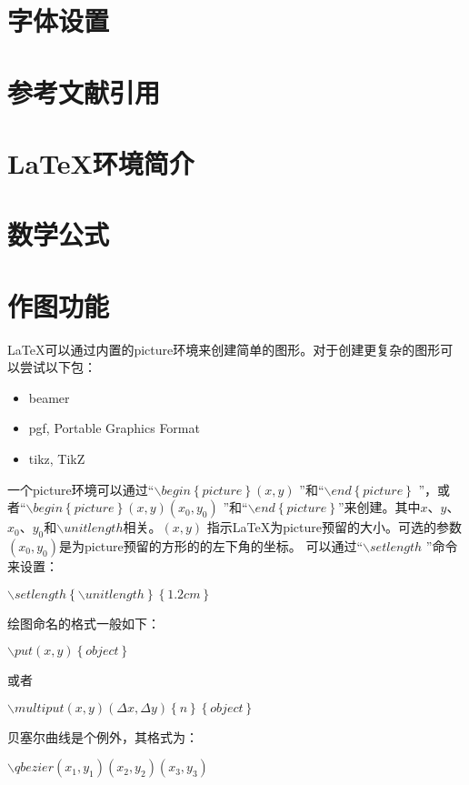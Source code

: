 \documentclass[11pt]{book}
\newcounter{#2}
\newcounter{#2}[#1]
\numberwithin{#2}{#1}
\begin{document}
		\section{字体设置}

		\section{参考文献引用}
		\section{\LaTeX 环境简介}
		\section{数学公式}
		\section{作图功能}
		\LaTeX 可以通过内置的picture环境来创建简单的图形。对于创建更复杂的图形可以尝试以下包：
		\begin{itemize}
			\item beamer
			\item pgf, Portable Graphics Format
			\item tikz, TikZ
		\end{itemize}
	
		一个picture环境可以通过“$ \backslash begin\left\{picture\right\}(x, y)$ ”和“$ \backslash end\left\{picture\right\}$ ”，或者“$ \backslash begin\left\{picture\right\}(x, y)(x_0, y_0)$ ”和“$ \backslash end\left\{picture\right\}$”来创建。其中$ x $、$ y $、$ x_0 $、$ y_0 $和$ \backslash unitlength $相关。$ (x, y) $ 指示\LaTeX 为picture预留的大小。可选的参数$ (x_0, y_0)$是为picture预留的方形的的左下角的坐标。
		可以通过“$ \backslash setlength$ ”命令来设置：
		\begin{center}
			$ \backslash setlength\left\lbrace \backslash unitlength \right\rbrace \left\lbrace 1.2cm \right\rbrace$
		\end{center}
	
		绘图命名的格式一般如下：
		\begin{center}
			$ \backslash put(x, y)\left\lbrace object\right\rbrace  $
		\end{center}
	或者
	\begin{center}
		$ \backslash multiput(x, y)(\Delta x, \Delta y)\left\lbrace n\right\rbrace\left\lbrace object\right\rbrace  $
	\end{center}
	贝塞尔曲线是个例外，其格式为：
		\begin{center}
		$ \backslash qbezier(x_1, y_1)(x_2, y_2)(x_3, y_3) $
	\end{center}
\end{document}
